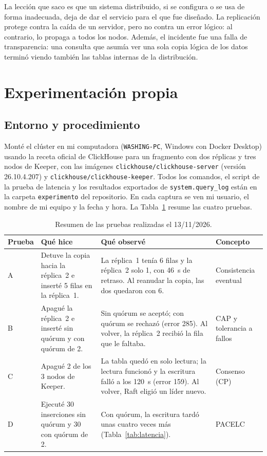 \documentclass[12pt,a4paper]{article}
\begin{document}
La lección que saco es que un sistema distribuido, si se configura o se
usa de forma inadecuada, deja de dar el servicio para el que fue
diseñado. La replicación protege contra la caída de un servidor, pero no
contra un error lógico: al contrario, lo propaga a todos los nodos.
Además, el incidente fue una falla de transparencia: una consulta que
asumía ver una sola copia lógica de los datos terminó viendo también las
tablas internas de la distribución.

\section{Experimentación propia}\label{sec:experimento}

\subsection{Entorno y procedimiento}

Monté el clúster en mi computadora (\texttt{WASHING-PC}, Windows con
Docker Desktop) usando la receta oficial de ClickHouse para un fragmento
con dos réplicas y tres nodos de Keeper, con las imágenes
\texttt{clickhouse/clickhouse-server} (versión 26.10.4.207) y
\texttt{clickhouse/clickhouse-keeper}. Todos los comandos, el script de
la prueba de latencia y los resultados exportados de
\texttt{system.query\_log} están en la carpeta \texttt{experimento} del
repositorio. En cada captura se ven mi usuario, el nombre de mi equipo y
la fecha y hora. La Tabla~\ref{tab:pruebas} resume las cuatro pruebas.

\begin{table}[htbp]
  \centering
  \caption{Resumen de las pruebas realizadas el 13/11/2026.}
  \label{tab:pruebas}
  \small
  \begin{tabularx}{\linewidth}{@{}l X X l@{}}
    \toprule
    \textbf{Prueba} & \textbf{Qué hice} & \textbf{Qué observé} &
      \textbf{Concepto} \\
    \midrule
    A & Detuve la copia hacia la réplica~2 e inserté 5 filas en la
      réplica~1. & La réplica~1 tenía 6 filas y la réplica~2 solo 1, con
      46~s de retraso. Al reanudar la copia, las dos quedaron con 6. &
      Consistencia eventual \\
    B & Apagué la réplica~2 e inserté sin quórum y con quórum de 2. &
      Sin quórum se aceptó; con quórum se rechazó (error 285). Al volver,
      la réplica~2 recibió la fila que le faltaba. & CAP y tolerancia a
      fallos \\
    C & Apagué 2 de los 3 nodos de Keeper. & La tabla quedó en solo
      lectura; la lectura funcionó y la escritura falló a los 120~s
      (error 159). Al volver, Raft eligió un líder nuevo. & Consenso
      (CP) \\
    D & Ejecuté 30 inserciones sin quórum y 30 con quórum de 2. & Con
      quórum, la escritura tardó unas cuatro veces más
      (Tabla~\ref{tab:latencia}). & PACELC \\
    \bottomrule
  \end{tabularx}
\end{table}
\end{document}
